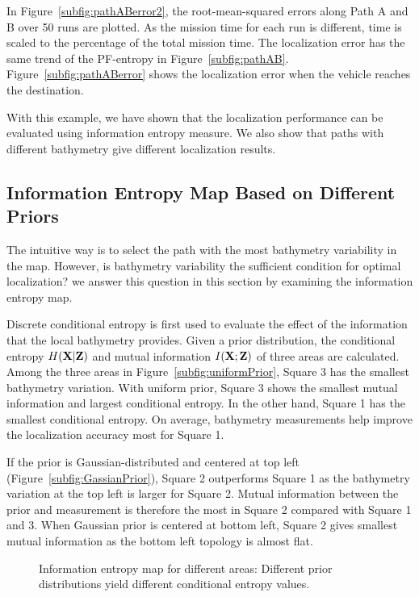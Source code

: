 In Figure~\ref{subfig:pathABerror2}, the root-mean-squared errors along Path A and B over 50 runs are plotted. As the mission time for each run is different, time is scaled to the percentage of the total mission time. The localization error has the same trend of the PF-entropy in Figure~\ref{subfig:pathAB}. Figure~\ref{subfig:pathABerror} shows the localization error when the vehicle reaches the destination. 

With this example, we have shown that the localization performance can be evaluated using information entropy measure. We also show that paths with different bathymetry give different localization results.

\subsection{Information Entropy Map Based on Different Priors}

The intuitive way is to select the path with the most bathymetry variability in the map. However, is bathymetry variability the sufficient condition for optimal localization? we answer this question in this section by examining the information entropy map.%

Discrete conditional entropy is first used to evaluate the effect of the information that the local bathymetry provides. Given a prior distribution, the conditional entropy $H({\bf X}|{\bf Z})$ and mutual information $I({\bf X};{\bf Z})$ of three areas are calculated. Among the three areas in Figure~\ref{subfig:uniformPrior}, Square 3 has the smallest bathymetry variation. With uniform prior, Square 3 shows the smallest mutual information and largest conditional entropy. In the other hand, Square 1 has the smallest conditional entropy. On average, bathymetry measurements help improve the localization accuracy most for Square 1.

If the prior is Gaussian-distributed and centered at top left (Figure~\ref{subfig:GassianPrior}), Square 2 outperforms Square 1 as the bathymetry variation at the top left is larger for Square 2. Mutual information between the prior and measurement is therefore the most in Square 2 compared with Square 1 and 3. When Gaussian prior is centered at bottom left, Square 2 gives smallest mutual information as the bottom left topology is almost flat.

\begin{figure}[htbp]
\begin{center}
\caption{Information entropy map for different areas: Different prior distributions yield different conditional entropy values.}
\label{fig:conditionalEntropy}
\end{center}
\end{figure}

